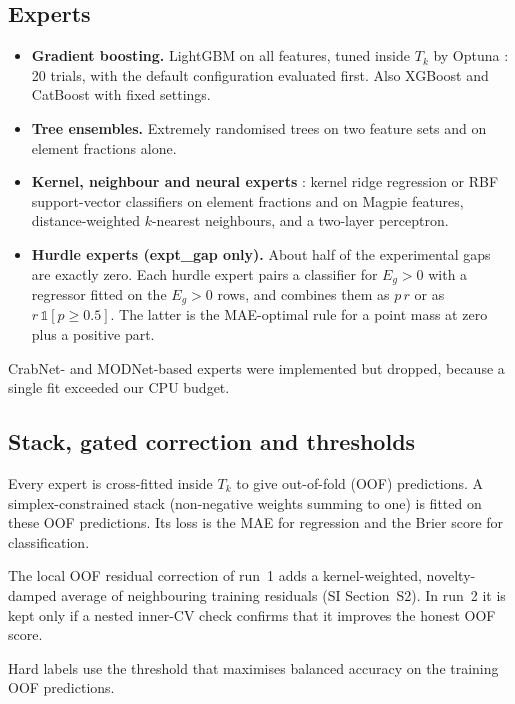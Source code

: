 \subsection{Experts}
\begin{itemize}
\item \textbf{Gradient boosting.} LightGBM \citep{ke2017lightgbm} on all features, tuned inside $T_k$ by Optuna \citep{akiba2019optuna}: 20 trials, with the default configuration evaluated first. Also XGBoost \citep{chen2016xgboost} and CatBoost \citep{prokhorenkova2018catboost} with fixed settings.
\item \textbf{Tree ensembles.} Extremely randomised trees \citep{geurts2006et} on two feature sets and on element fractions alone.
\item \textbf{Kernel, neighbour and neural experts} \citep{pedregosa2011sklearn}: kernel ridge regression or RBF support-vector classifiers on element fractions and on Magpie features, distance-weighted $k$-nearest neighbours, and a two-layer perceptron.
\item \textbf{Hurdle experts (expt\_gap only).} About half of the experimental gaps are exactly zero. Each hurdle expert pairs a classifier for $E_g>0$ with a regressor fitted on the $E_g>0$ rows, and combines them as $p\,r$ or as $r\,\mathbb{1}[p\ge 0.5]$. The latter is the MAE-optimal rule for a point mass at zero plus a positive part.
\end{itemize}
CrabNet- \citep{wang2021crabnet} and MODNet-based experts were implemented but dropped, because a single fit exceeded our CPU budget.

\subsection{Stack, gated correction and thresholds}
Every expert is cross-fitted inside $T_k$ to give out-of-fold (OOF) predictions.
A simplex-constrained stack (non-negative weights summing to one) is fitted on these OOF predictions. Its loss is the MAE for regression and the Brier score for classification.

The local OOF residual correction of run~1 adds a kernel-weighted, novelty-damped average of neighbouring training residuals (SI Section~S2). In run~2 it is kept only if a nested inner-CV check confirms that it improves the honest OOF score.

Hard labels use the threshold that maximises balanced accuracy on the training OOF predictions.

